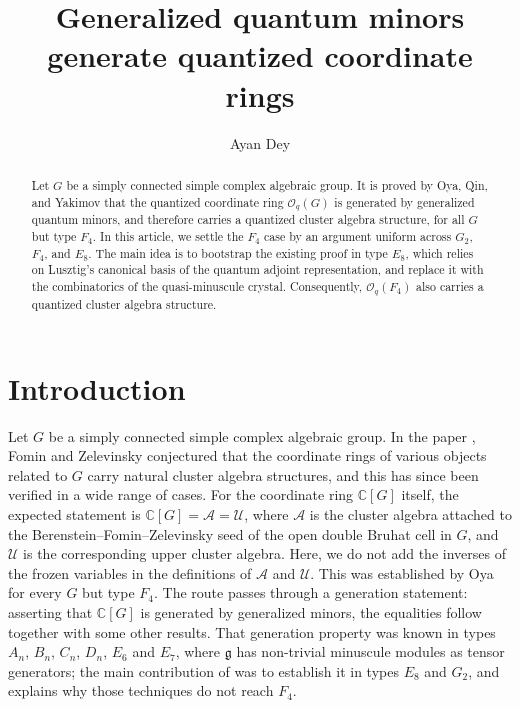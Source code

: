 \documentclass[12pt]{amsart}
\theoremstyle{plain}
\theoremstyle{remark}
\newcommand{\g}{\mathfrak{g}}
\begin{document}
\title{Generalized quantum minors generate quantized coordinate rings}
\author{Ayan Dey}
\date{}
\maketitle



\begin{abstract}
Let $G$ be a simply connected simple complex algebraic group. It is proved by Oya, Qin, and Yakimov \cite{OQY} that the quantized coordinate ring $\mathcal{O}_q(G)$ is generated
by generalized quantum minors, and therefore carries a quantized cluster algebra structure, for all $G$ but type $F_4$. In this article, we settle the $F_4$ case by an argument uniform across $G_2$, $F_4$, and $E_8$. The main idea is to bootstrap the existing proof in type $E_8$, which relies on Lusztig's canonical basis of the quantum adjoint representation, and replace it with the combinatorics of the quasi-minuscule
crystal. Consequently, $\mathcal{O}_q(F_4)$ also carries a quantized cluster algebra
structure.
\end{abstract}

\section{Introduction}\label{sec:intro}

Let $G$ be a simply connected simple complex algebraic group. In the 
paper \cite{FZ}, Fomin and Zelevinsky conjectured that the coordinate rings of
various objects related to $G$ carry natural cluster algebra structures, and this
has since been verified in a wide range of cases. For the coordinate ring
$\mathbb{C}[G]$ itself, the expected statement is $
\mathbb{C}[G]=\mathscr{A}=\mathscr{U}$,
where $\mathscr{A}$ is the cluster algebra attached to the
Berenstein--Fomin--Zelevinsky seed of the open double Bruhat cell in $G$, and $\mathscr{U}$ is the corresponding upper cluster algebra. Here, we do not add the inverses of the frozen variables in the definitions of $\mathscr{A}$ and $\mathscr{U}$. This was established by Oya
\cite{Oya} for every $G$ but type $F_4$. The route passes through a generation
statement: asserting that $\mathbb{C}[G]$ is generated by generalized minors, the
equalities follow together with some other results. That generation property was known in types $A_n$, $B_n$, $C_n$,
$D_n$, $E_6$ and $E_7$, where $\g$ has non-trivial minuscule modules as tensor generators; the main
contribution of \cite{Oya} was to establish it in types $E_8$ and $G_2$, and
\cite[Remark~3.10]{Oya} explains why those techniques do not reach $F_4$.
\end{document}
